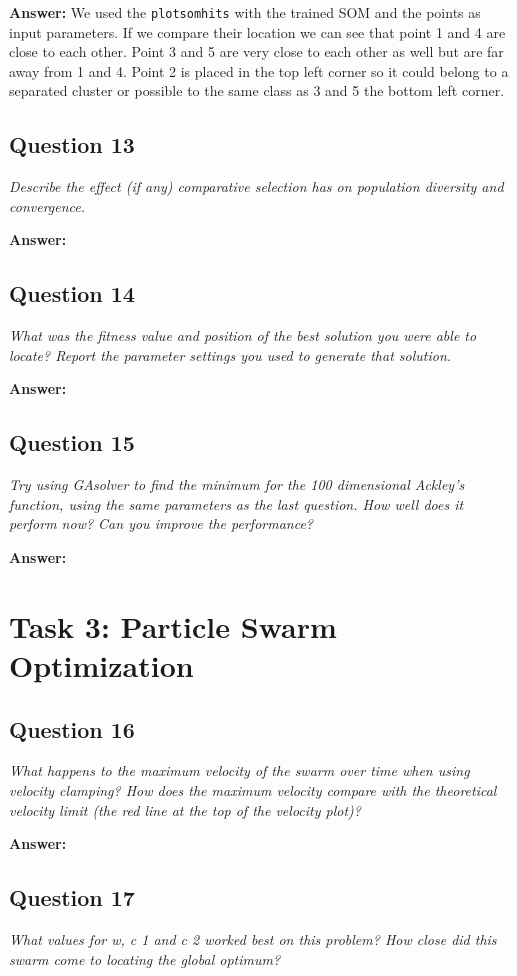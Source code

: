 \documentclass[a4paper]{article}
\begin{document}
\textbf{Answer:} We used the \texttt{plotsomhits} with the trained SOM and the points as input parameters. If we compare their location we can see that point 1 and 4 are close to each other. Point 3 and 5 are very close to each other as well but are far away from 1 and 4. Point 2 is placed in the top left corner so it could belong to a separated cluster or possible to the same class as 3 and 5 the bottom left corner.

\subsection*{Question 13}
\emph{Describe the effect (if any) comparative selection has on population diversity and convergence.} 

\textbf{Answer:}

\subsection*{Question 14}
\emph{What was the fitness value and position of the best solution you
were able to locate? Report the parameter settings you used to generate that solution.} 

\textbf{Answer:}

\subsection*{Question 15}
\emph{Try using GAsolver to find the minimum for the 100 dimensional Ackley’s function, using the same parameters as the last question. How
well does it perform now? Can you improve the performance?} 

\textbf{Answer:}

\section*{Task 3: Particle Swarm Optimization}

\subsection*{Question 16}
\emph{What happens to the maximum velocity of the swarm over time
when using velocity clamping? How does the maximum velocity compare with
the theoretical velocity limit (the red line at the top of the velocity plot)?} 

\textbf{Answer:}

\subsection*{Question 17}
\emph{What values for w, c 1 and c 2 worked best on this problem? How
close did this swarm come to locating the global optimum?} 
\end{document}
